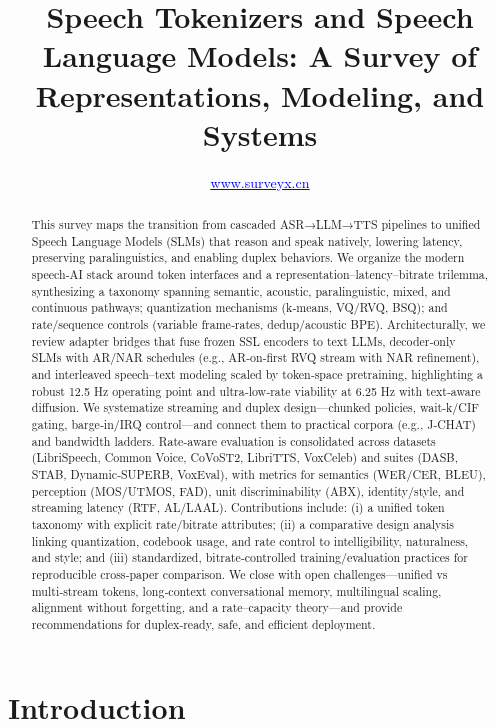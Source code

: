 \documentclass{article}
\title{Speech Tokenizers and Speech Language Models: A Survey of Representations, Modeling, and Systems}
\author{\href{http://www.surveyx.cn}{\textcolor{blue}{\underline{www.surveyx.cn}}}}
\begin{document}
\maketitle

 

\begin{abstract}
This survey maps the transition from cascaded ASR→LLM→TTS pipelines to unified Speech Language Models (SLMs) that reason and speak natively, lowering latency, preserving paralinguistics, and enabling duplex behaviors. We organize the modern speech‑AI stack around token interfaces and a representation–latency–bitrate trilemma, synthesizing a taxonomy spanning semantic, acoustic, paralinguistic, mixed, and continuous pathways; quantization mechanisms (k‑means, VQ/RVQ, BSQ); and rate/sequence controls (variable frame‑rates, dedup/acoustic BPE). Architecturally, we review adapter bridges that fuse frozen SSL encoders to text LLMs, decoder‑only SLMs with AR/NAR schedules (e.g., AR‑on‑first RVQ stream with NAR refinement), and interleaved speech–text modeling scaled by token‑space pretraining, highlighting a robust 12.5 Hz operating point and ultra‑low‑rate viability at 6.25 Hz with text‑aware diffusion. We systematize streaming and duplex design—chunked policies, wait‑k/CIF gating, barge‑in/IRQ control—and connect them to practical corpora (e.g., J‑CHAT) and bandwidth ladders. Rate‑aware evaluation is consolidated across datasets (LibriSpeech, Common Voice, CoVoST2, LibriTTS, VoxCeleb) and suites (DASB, STAB, Dynamic‑SUPERB, VoxEval), with metrics for semantics (WER/CER, BLEU), perception (MOS/UTMOS, FAD), unit discriminability (ABX), identity/style, and streaming latency (RTF, AL/LAAL). Contributions include: (i) a unified token taxonomy with explicit rate/bitrate attributes; (ii) a comparative design analysis linking quantization, codebook usage, and rate control to intelligibility, naturalness, and style; and (iii) standardized, bitrate‑controlled training/evaluation practices for reproducible cross‑paper comparison. We close with open challenges—unified vs multi‑stream tokens, long‑context conversational memory, multilingual scaling, alignment without forgetting, and a rate–capacity theory—and provide recommendations for duplex‑ready, safe, and efficient deployment.
\end{abstract}


\section{Introduction} \label{sec:Introduction}
\end{document}
